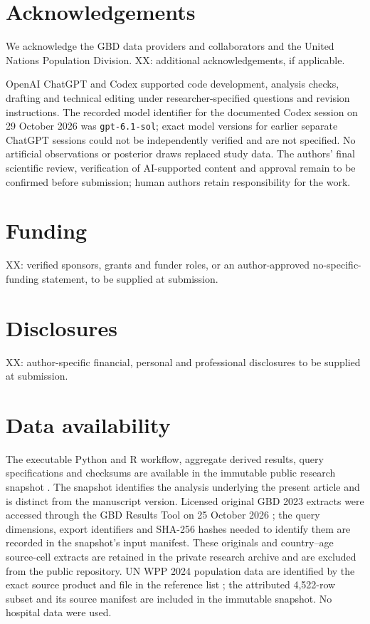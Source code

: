 \documentclass[11pt,a4paper]{article}
\begin{document}
\section*{Acknowledgements}
We acknowledge the GBD data providers and collaborators and the United Nations Population Division. XX: additional acknowledgements, if applicable.

OpenAI ChatGPT and Codex supported code development, analysis checks, drafting and technical editing under researcher-specified questions and revision instructions. The recorded model identifier for the documented Codex session on 29 October 2026 was \texttt{gpt-6.1-sol}; exact model versions for earlier separate ChatGPT sessions could not be independently verified and are not specified. No artificial observations or posterior draws replaced study data. The authors' final scientific review, verification of AI-supported content and approval remain to be confirmed before submission; human authors retain responsibility for the work.

\section*{Funding}
XX: verified sponsors, grants and funder roles, or an author-approved no-specific-funding statement, to be supplied at submission.

\section*{Disclosures}
XX: author-specific financial, personal and professional disclosures to be supplied at submission.

\section*{Data availability}
The executable Python and R workflow, aggregate derived results, query specifications and checksums are available in the immutable public research snapshot \citep{repository}. The snapshot identifies the analysis underlying the present article and is distinct from the manuscript version. Licensed original GBD 2023 extracts were accessed through the GBD Results Tool on 25 October 2026 \citep{results}; the query dimensions, export identifiers and SHA-256 hashes needed to identify them are recorded in the snapshot's input manifest. These originals and country--age source-cell extracts are retained in the private research archive and are excluded from the public repository. UN WPP 2024 population data are identified by the exact source product and file in the reference list \citep{wpp2024}; the attributed 4,522-row subset and its source manifest are included in the immutable snapshot. No hospital data were used.
\end{document}
